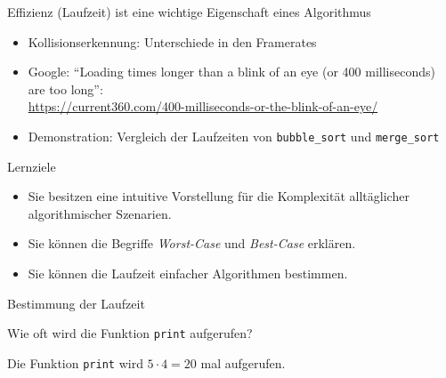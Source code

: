 \begin{frame}{Effizienz (Laufzeit) ist eine wichtige Eigenschaft eines Algorithmus}
	\begin{itemize}[<+->]
		\item Kollisionserkennung: Unterschiede in den Framerates
		\item Google: \enquote{Loading times longer than a blink of an eye (or 400 milliseconds) are too long}:\\
		\url{https://current360.com/400-milliseconds-or-the-blink-of-an-eye/}
		\item Demonstration: Vergleich der Laufzeiten von \texttt{bubble\_sort} und \texttt{merge\_sort}
	\end{itemize}
\end{frame}

\begin{frame}{Lernziele}
	\begin{itemize}[<+->]
		\item Sie besitzen eine intuitive Vorstellung für die Komplexität alltäglicher algorithmischer Szenarien.
		\item Sie können die Begriffe \emph{Worst-Case} und \emph{Best-Case} erklären.
		\item Sie können die Laufzeit einfacher Algorithmen bestimmen.
	\end{itemize}
\end{frame}

\begin{frame}{Bestimmung der Laufzeit \faStar\faStar[regular]\faStar[regular]\faStar[regular]\faStar[regular]}
	\begin{myexercise}
    
    
    Wie oft wird die Funktion \lstinline{print} aufgerufen?
	\end{myexercise}
\end{frame}

\begin{frame}
\begin{myanswer}
    Die Funktion \lstinline{print} wird $5\cdot 4 = 20$ mal aufgerufen.
\end{myanswer}
\end{frame}

